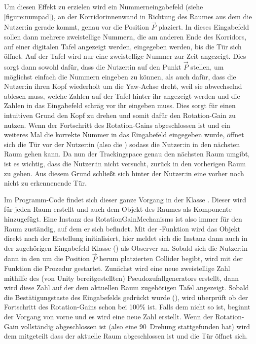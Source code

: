 Um diesen Effekt zu erzielen wird ein Nummerneingabefeld (siehe \autoref{figure:numpad}), an der Korridorinnenwand in Richtung des Raumes aus dem die Nutzer:in gerade kommt, genau vor die Position $\vec{P}$ plaziert. In dieses Eingabefeld sollen dann mehrere zweistellige Nummern, die am anderen Ende des Korridors, auf einer digitalen Tafel angezeigt werden, eingegeben werden, bis die Tür sich öffnet. Auf der Tafel wird nur eine zweistellige Nummer zur Zeit angezeigt.
Dies sorgt dann sowohl dafür, dass die Nutzer:in auf den Punkt $\vec{P}$ stellen, um möglichst einfach die Nummern eingeben zu können, als auch dafür, dass die Nutzer:in ihren Kopf wiederholt um die Yaw-Achse dreht, weil sie abwechselnd ablesen muss, welche Zahlen auf der Tafel hinter ihr angezeigt werden und die Zahlen in das Eingabefeld schräg vor ihr eingeben muss. Dies sorgt für einen intuitiven Grund den Kopf zu drehen und somit dafür den Rotation-Gain zu nutzen. Wenn der Fortschritt des Rotation-Gains abgeschlossen ist und ein weiteres Mal die korrekte Nummer in das Eingabefeld eingegeben wurde, öffnet sich die Tür vor der Nutzer:in (also die ) sodass die Nutzer:in in den nächsten Raum gehen kann. Da nun der Trackingspace genau den nächsten Raum umgibt, ist es wichtig, dass die Nutzer:in nicht versucht, zurück in den vorherigen Raum zu gehen. Aus diesem Grund schließt sich hinter der Nutzer:in eine vorher noch nicht zu erkennenende Tür.

Im Programm-Code findet sich dieser ganze Vorgang in der Klasse . Dieser wird für jeden Raum erstellt und auch dem Objekt des Raumes als Komponente hinzugefügt. Eine Instanz des RotationGainMechanisms ist also immer für den Raum zuständig, auf dem er sich befindet. Mit der -Funktion wird das Objekt direkt nach der Erstellung initialisiert, hier meldet sich die Instanz dann auch in der zugehörigen Eingabefeld-Klasse () als Observer an. Sobald sich die Nutzer:in dann in den um die Position $\vec{P}$ herum platzierten Collider begibt, wird mit der Funktion  die Prozedur gestartet. Zunächst wird eine neue zweistellige Zahl mithilfe des (von Unity bereitgestellten) Pseudozufallgenerators erstellt, dann wird diese Zahl auf der dem aktuellen Raum zugehörigen Tafel angezeigt. Sobald die Bestätigungstaste des Eingabefelds gedrückt wurde (\textquote{\#}), wird überprüft ob der Fortschritt des Rotation-Gains schon bei 100\% ist. Falls dem nicht so ist, beginnt der Vorgang von vorne und es wird eine neue Zahl erstellt. Wenn der Rotation-Gain vollständig abgeschlossen ist (also eine 90\textdegree\ Drehung stattgefunden hat) wird dem  mitgeteilt dass der aktuelle Raum abgeschlossen ist und die Tür öffnet sich.

